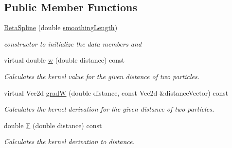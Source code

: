 \subsection*{Public Member Functions}
\begin{CompactItemize}
\item 
\hyperlink{classBetaSpline_00e744e584e6e7291813ab5e59d801ec}{BetaSpline} (double \hyperlink{classKernel_f088821dba4a00d1d320b27ebcb71258}{smoothingLength})
\begin{CompactList}\small\item\em constructor to initialize the data members and \item\end{CompactList}\item 
virtual double \hyperlink{classBetaSpline_797016b36239b0be98c3aa0715bb045a}{w} (double distance) const 
\begin{CompactList}\small\item\em Calculates the kernel value for the given distance of two particles. \item\end{CompactList}\item 
virtual Vec2d \hyperlink{classBetaSpline_409d22f7b4165a612ffbb62400e55db7}{gradW} (double distance, const Vec2d \&distanceVector) const 
\begin{CompactList}\small\item\em Calculates the kernel derivation for the given distance of two particles. \item\end{CompactList}\item 
\hypertarget{classBetaSpline_5b01a3303b3d45e74cdbff21419a07ff}{
double \hyperlink{classBetaSpline_5b01a3303b3d45e74cdbff21419a07ff}{F} (double distance) const }
\label{classBetaSpline_5b01a3303b3d45e74cdbff21419a07ff}

\begin{CompactList}\small\item\em Calculates the kernel derivation to distance. \item\end{CompactList}\end{CompactItemize}
